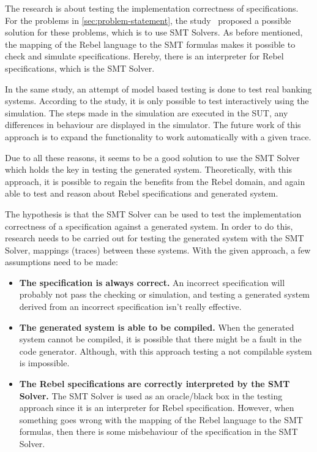 The research is about testing the implementation correctness of specifications.
For the problems in \autoref{sec:problem-statement}, the
study~\cite[p.3]{stoelcase} proposed a possible solution for these problems,
which is to use SMT Solvers. As before mentioned, the mapping of the Rebel
language to the SMT formulas makes it possible to check and simulate
specifications. Hereby, there is an interpreter for Rebel specifications, which
is the SMT Solver.~\cite[p.5]{stoel_storm_vinju_bosman_2016}

In the same study,
an attempt of model based testing is done to test real banking systems.
According to the study, it is only possible to test interactively using the
simulation. The steps made in the simulation are executed in the SUT, any
differences in behaviour are displayed in the simulator. The future work of this
approach is to expand the functionality to work automatically with a given
trace.

Due to all these reasons, it seems to be a good solution to use the SMT
Solver which holds the key in testing the generated system. Theoretically, with
this approach, it is possible to regain the benefits from the Rebel domain, and
again able to test and reason about Rebel specifications and generated system.


The hypothesis is that the SMT Solver can be used to test the implementation
correctness of a specification against a generated system. In order to do this,
research needs to be carried out for testing the generated system
with the SMT Solver, mappings (traces) between these systems. With the given approach, a
few assumptions need to be made:
\begin{itemize}
\item \textbf{The specification is always correct.} An incorrect specification
will probably not pass the checking or simulation, and testing a generated
system derived from an incorrect specification isn't really effective.
\item \textbf{The generated system is able to be compiled.} When the generated
system cannot be compiled, it is possible that there might be a fault in the
code generator. Although, with this approach testing a not compilable system is
impossible.
\item \textbf{The Rebel specifications are correctly interpreted by the SMT
Solver.} The SMT Solver is used as an oracle/black box in the testing approach
since it is an interpreter for Rebel specification. However, when something goes
wrong with the mapping of the Rebel language to the SMT formulas, then there is
some misbehaviour of the specification in the SMT Solver.
\end{itemize}

